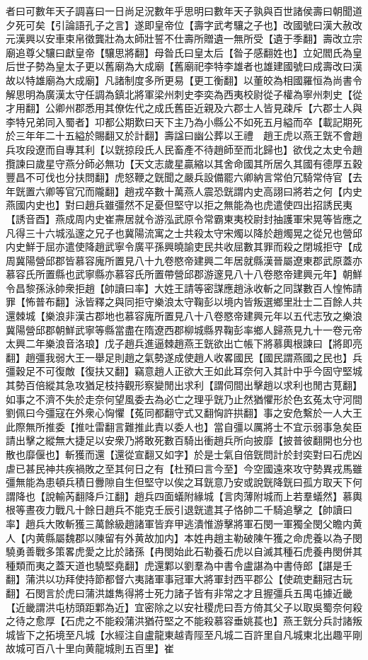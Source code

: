者曰可數年天子調喜曰一日尚足況數年乎思明曰數年天子孰與百世諸侯壽曰朝聞道夕死可矣【引論語孔子之言】遂即皇帝位【壽字武考驤之子也】改國號曰漢大赦改元漢興以安車束帛徵龔壯為太師壯誓不仕壽所贈遺一無所受【遺于季翻】壽改立宗廟追尊父驤曰獻皇帝【驤思將翻】母昝氏曰皇太后【昝子感翻姓也】立妃閻氏為皇后世子勢為皇太子更以舊廟為大成廟【舊廟祀李特李雄者也雄建國號曰成壽改曰漢故以特雄廟為大成廟】凡諸制度多所更易【更工衡翻】以董皎為相國羅恒為尚書令解思明為廣漢太守任調為鎮北將軍梁州刺史李奕為西夷校尉從子權為寧州刺史【從才用翻】公卿州郡悉用其僚佐代之成氏舊臣近親及六郡士人皆見疎斥【六郡士人與李特兄弟同入蜀者】卭都公期歎曰天下主乃為小縣公不如死五月縊而卒【載記期死於三年年二十五縊於賜翻又於計翻】壽諡曰幽公葬以王禮　趙王虎以燕王皝不會趙兵攻段遼而自專其利【以皝掠段氏人民畜產不待趙師至而北歸也】欲伐之太史令趙攬諫曰歲星守燕分師必無功【天文志歲星贏縮以其舍命國其所居久其國有德厚五穀豐昌不可伐也分扶問翻】虎怒鞭之皝聞之嚴兵設備罷六卿納言常伯冗騎常侍官【去年皝置六卿等官冗而隴翻】趙戎卒數十萬燕人震恐皝謂内史高詡曰將若之何【内史燕國内史也】對曰趙兵雖彊然不足憂但堅守以拒之無能為也虎遣使四出招誘民夷【誘音酉】燕成周内史崔燾居就令游泓武原令常霸東夷校尉封抽護軍宋晃等皆應之凡得三十六城泓邃之兄子也冀陽流寓之士共殺太守宋燭以降於趙燭晃之從兄也營邱内史鮮于屈亦遣使降趙武寧令廣平孫興曉諭吏民共收屈數其罪而殺之閉城拒守【成周冀陽營邱郡皆慕容廆所置見八十九卷愍帝建興二年居就縣漢晉屬遼東郡武原蓋亦慕容氏所置縣也武寧縣亦慕容氏所置帶營邱郡游邃見八十八卷愍帝建興元年】朝鮮令昌黎孫泳帥衆拒趙【帥讀曰率】大姓王請等密謀應趙泳收斬之同謀數百人惶怖請罪【怖普布翻】泳皆釋之與同拒守樂浪太守鞠彭以境内皆叛選鄉里壯士二百餘人共還棘城【樂浪非漢古郡地也慕容廆所置見八十八卷愍帝建興元年以五代志攷之樂浪冀陽營邱郡朝鮮武寧等縣當盡在隋遼西郡柳城縣界鞠彭率鄉人歸燕見九十一卷元帝太興二年樂浪音洛琅】戊子趙兵進逼棘趙燕王皝欲出亡帳下將慕輿根諫曰【將即亮翻】趙彊我弱大王一舉足則趙之氣勢遂成使趙人收畧國民【國民謂燕國之民也】兵彊穀足不可復敵【復扶又翻】竊意趙人正欲大王如此耳奈何入其計中乎今固守堅城其勢百倍縱其急攻猶足枝持觀形察變閒出求利【謂伺間出擊趙以求利也閒古莧翻】如事之不濟不失於走奈何望風委去為必亡之理乎皝乃止然猶懼形於色玄菟太守河間劉佩曰今彊寇在外衆心恟懼【菟同都翻守式又翻恟許拱翻】事之安危繫於一人大王此際無所推委【推吐雷翻言難推此責以委人也】當自彊以厲將士不宜示弱事急矣臣請出擊之縱無大捷足以安衆乃將敢死數百騎出衝趙兵所向披靡【披普彼翻開也分也散也靡偃也】斬獲而還【還從宣翻又如字】於是士氣自倍皝問計於封奕對曰石虎凶虐已甚民神共疾禍敗之至其何日之有【杜預曰言今至】今空國遠來攻守勢異戎馬雖彊無能為患頓兵積日釁隙自生但堅守以俟之耳皝意乃安或說皝降皝曰孤方取天下何謂降也【說輸芮翻降戶江翻】趙兵四面蟻附緣城【言肉薄附城而上若羣蟻然】慕輿根等晝夜力戰凡十餘日趙兵不能克壬辰引退皝遣其子恪帥二千騎追擊之【帥讀曰率】趙兵大敗斬獲三萬餘級趙諸軍皆弃甲逃潰惟游擊將軍石閔一軍獨全閔父瞻内黄人【内黄縣屬魏郡以陳留有外黄故加内】本姓冉趙主勒破陳午獲之命虎養以為子閔驍勇善戰多策畧虎愛之比於諸孫【冉閔始此石勒養石虎以自滅其種石虎養冉閔併其種類而夷之蓋天道也驍堅堯翻】虎還鄴以劉羣為中書令盧諶為中書侍郎【諶是壬翻】蒲洪以功拜使持節都督六夷諸軍事冠軍大將軍封西平郡公【使疏吏翻冠古玩翻】石閔言於虎曰蒲洪雄雋得將士死力諸子皆有非常之才且握彊兵五禺屯據近畿【近畿謂洪屯枋頭距鄴為近】宜密除之以安社稷虎曰吾方倚其父子以取吳蜀奈何殺之待之愈厚【石虎之不能殺蒲洪猶苻堅之不能殺慕容垂姚萇也】燕王皝分兵討諸叛城皆下之拓境至凡城【水經注自盧龍東越青陘至凡城二百許里自凡城東北出趣平剛故城可百八十里向黄龍城則五百里】崔